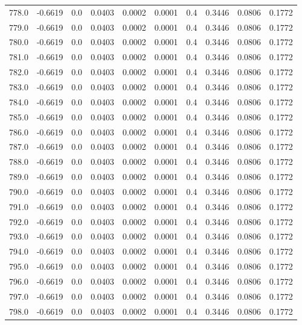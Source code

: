 \begin{longtable}{lrrrrrrrrr}
778.0 & -0.6619 & 0.0 & 0.0403 & 0.0002 & 0.0001 & 0.4 & 0.3446 & 0.0806 & 0.1772 \\
779.0 & -0.6619 & 0.0 & 0.0403 & 0.0002 & 0.0001 & 0.4 & 0.3446 & 0.0806 & 0.1772 \\
780.0 & -0.6619 & 0.0 & 0.0403 & 0.0002 & 0.0001 & 0.4 & 0.3446 & 0.0806 & 0.1772 \\
781.0 & -0.6619 & 0.0 & 0.0403 & 0.0002 & 0.0001 & 0.4 & 0.3446 & 0.0806 & 0.1772 \\
782.0 & -0.6619 & 0.0 & 0.0403 & 0.0002 & 0.0001 & 0.4 & 0.3446 & 0.0806 & 0.1772 \\
783.0 & -0.6619 & 0.0 & 0.0403 & 0.0002 & 0.0001 & 0.4 & 0.3446 & 0.0806 & 0.1772 \\
784.0 & -0.6619 & 0.0 & 0.0403 & 0.0002 & 0.0001 & 0.4 & 0.3446 & 0.0806 & 0.1772 \\
785.0 & -0.6619 & 0.0 & 0.0403 & 0.0002 & 0.0001 & 0.4 & 0.3446 & 0.0806 & 0.1772 \\
786.0 & -0.6619 & 0.0 & 0.0403 & 0.0002 & 0.0001 & 0.4 & 0.3446 & 0.0806 & 0.1772 \\
787.0 & -0.6619 & 0.0 & 0.0403 & 0.0002 & 0.0001 & 0.4 & 0.3446 & 0.0806 & 0.1772 \\
788.0 & -0.6619 & 0.0 & 0.0403 & 0.0002 & 0.0001 & 0.4 & 0.3446 & 0.0806 & 0.1772 \\
789.0 & -0.6619 & 0.0 & 0.0403 & 0.0002 & 0.0001 & 0.4 & 0.3446 & 0.0806 & 0.1772 \\
790.0 & -0.6619 & 0.0 & 0.0403 & 0.0002 & 0.0001 & 0.4 & 0.3446 & 0.0806 & 0.1772 \\
791.0 & -0.6619 & 0.0 & 0.0403 & 0.0002 & 0.0001 & 0.4 & 0.3446 & 0.0806 & 0.1772 \\
792.0 & -0.6619 & 0.0 & 0.0403 & 0.0002 & 0.0001 & 0.4 & 0.3446 & 0.0806 & 0.1772 \\
793.0 & -0.6619 & 0.0 & 0.0403 & 0.0002 & 0.0001 & 0.4 & 0.3446 & 0.0806 & 0.1772 \\
794.0 & -0.6619 & 0.0 & 0.0403 & 0.0002 & 0.0001 & 0.4 & 0.3446 & 0.0806 & 0.1772 \\
795.0 & -0.6619 & 0.0 & 0.0403 & 0.0002 & 0.0001 & 0.4 & 0.3446 & 0.0806 & 0.1772 \\
796.0 & -0.6619 & 0.0 & 0.0403 & 0.0002 & 0.0001 & 0.4 & 0.3446 & 0.0806 & 0.1772 \\
797.0 & -0.6619 & 0.0 & 0.0403 & 0.0002 & 0.0001 & 0.4 & 0.3446 & 0.0806 & 0.1772 \\
798.0 & -0.6619 & 0.0 & 0.0403 & 0.0002 & 0.0001 & 0.4 & 0.3446 & 0.0806 & 0.1772 \\

\end{longtable}
